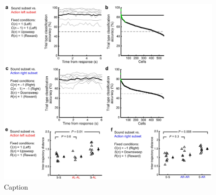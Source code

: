 \begin{figure}[htbp]

\begin{center}
\includegraphics[width=\textwidth]{Figures/NN_figS7.jpg} 
\end{center}

\caption[Rule-decoding and neural trajectory separation in fixed trial conditions.]
{Caption}

\label{fig:NN_figS7}
\end{figure}